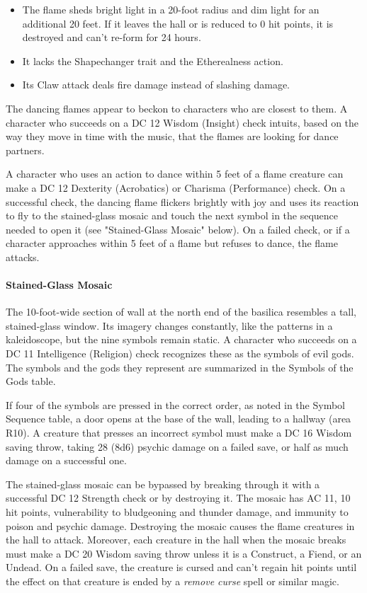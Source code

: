 \documentclass[a4paper, 11pt, bg=full, twocolumn, nooutline]{dndbook}
\begin{document}
\begin{itemize}
\item The flame sheds bright light in a 20-foot radius and dim light for an additional 20 feet. If it leaves the hall or is reduced to 0 hit points, it is destroyed and can't re-form for 24 hours.
\item It lacks the Shapechanger trait and the Etherealness action.
\item Its Claw attack deals fire damage instead of slashing damage.
\end{itemize}

The dancing flames appear to beckon to characters who are closest to them. A character who succeeds on a DC 12 Wisdom (Insight) check intuits, based on the way they move in time with the music, that the flames are looking for dance partners.

A character who uses an action to dance within 5 feet of a flame creature can make a DC 12 Dexterity (Acrobatics) or Charisma (Performance) check. On a successful check, the dancing flame flickers brightly with joy and uses its reaction to fly to the stained-glass mosaic and touch the next symbol in the sequence needed to open it (see "Stained-Glass Mosaic" below). On a failed check, or if a character approaches within 5 feet of a flame but refuses to dance, the flame attacks.

\paragraph{Stained-Glass Mosaic}

The 10-foot-wide section of wall at the north end of the basilica resembles a tall, stained-glass window. Its imagery changes constantly, like the patterns in a kaleidoscope, but the nine symbols remain static. A character who succeeds on a DC 11 Intelligence (Religion) check recognizes these as the symbols of evil gods. The symbols and the gods they represent are summarized in the Symbols of the Gods table.

If four of the symbols are pressed in the correct order, as noted in the Symbol Sequence table, a door opens at the base of the wall, leading to a hallway (area R10). A creature that presses an incorrect symbol must make a DC 16 Wisdom saving throw, taking 28 (8d6) psychic damage on a failed save, or half as much damage on a successful one.

The stained-glass mosaic can be bypassed by breaking through it with a successful DC 12 Strength check or by destroying it. The mosaic has AC 11, 10 hit points, vulnerability to bludgeoning and thunder damage, and immunity to poison and psychic damage. Destroying the mosaic causes the flame creatures in the hall to attack. Moreover, each creature in the hall when the mosaic breaks must make a DC 20 Wisdom saving throw unless it is a Construct, a Fiend, or an Undead. On a failed save, the creature is cursed and can't regain hit points until the effect on that creature is ended by a \textit{remove curse} spell or similar magic.
\end{document}
